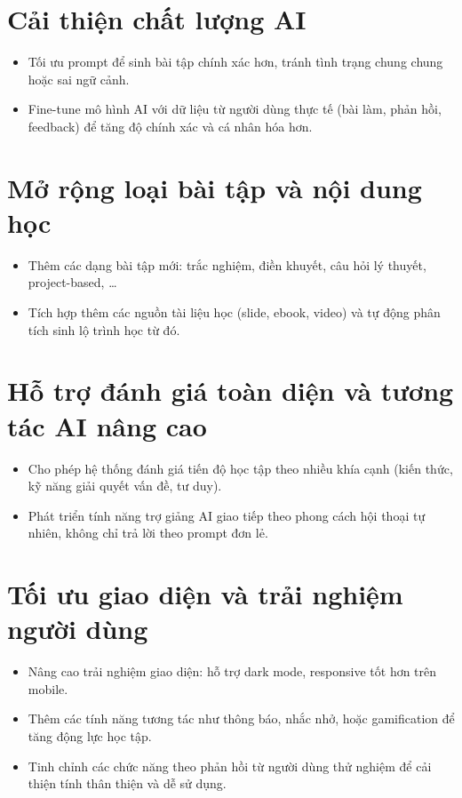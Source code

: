 
\section{Cải thiện chất lượng AI}
\begin{itemize}
	\item Tối ưu prompt để sinh bài tập chính xác hơn, tránh tình trạng chung chung hoặc sai ngữ cảnh.
	\item Fine-tune mô hình AI với dữ liệu từ người dùng thực tế (bài làm, phản hồi, feedback) để tăng độ chính xác và cá nhân hóa hơn.
\end{itemize}

\section{Mở rộng loại bài tập và nội dung học}
\begin{itemize}
	\item Thêm các dạng bài tập mới: trắc nghiệm, điền khuyết, câu hỏi lý thuyết, project-based, \dots
	\item Tích hợp thêm các nguồn tài liệu học (slide, ebook, video) và tự động phân tích sinh lộ trình học từ đó.
\end{itemize}

\section{Hỗ trợ đánh giá toàn diện và tương tác AI nâng cao}
\begin{itemize}
	\item Cho phép hệ thống đánh giá tiến độ học tập theo nhiều khía cạnh (kiến thức, kỹ năng giải quyết vấn đề, tư duy).
	\item Phát triển tính năng trợ giảng AI giao tiếp theo phong cách hội thoại tự nhiên, không chỉ trả lời theo prompt đơn lẻ.
\end{itemize}

\section{Tối ưu giao diện và trải nghiệm người dùng}
\begin{itemize}
	\item Nâng cao trải nghiệm giao diện: hỗ trợ dark mode, responsive tốt hơn trên mobile.
	\item Thêm các tính năng tương tác như thông báo, nhắc nhở, hoặc gamification để tăng động lực học tập.
    \item Tinh chỉnh các chức năng theo phản hồi từ người dùng thử nghiệm để cải thiện tính thân thiện và dễ sử dụng.
\end{itemize}
